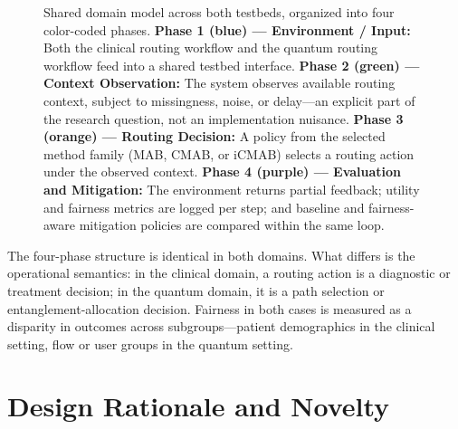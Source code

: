 \documentclass{IEEEtran}
\begin{document}
\begin{figure}[!t]
{%
}
\caption{%
  Shared domain model across both testbeds, organized into four
  color-coded phases.
  \textcolor{phase1blue}{\textbf{Phase 1 (blue) --- Environment / Input:}}
    Both the clinical routing workflow and the quantum routing workflow feed
    into a shared testbed interface.
  \textcolor{phase2green}{\textbf{Phase 2 (green) --- Context Observation:}}
    The system observes available routing context, subject to missingness,
    noise, or delay---an explicit part of the research question, not an
    implementation nuisance.
  \textcolor{phase3orange}{\textbf{Phase 3 (orange) --- Routing Decision:}}
    A policy from the selected method family (MAB, CMAB, or iCMAB) selects
    a routing action under the observed context.
  \textcolor{phase4purple}{\textbf{Phase 4 (purple) --- Evaluation and Mitigation:}}
    The environment returns partial feedback; utility and fairness metrics
    are logged per step; and baseline and fairness-aware mitigation policies
    are compared within the same loop.}
\label{fig:domain_model}
\end{figure}

The four-phase structure is identical in both domains. What differs is the
operational semantics: in the clinical domain, a routing action is a
diagnostic or treatment decision; in the quantum domain, it is a path
selection or entanglement-allocation decision. Fairness in both cases is
measured as a disparity in outcomes across subgroups---patient demographics
in the clinical setting, flow or user groups in the quantum setting.

\section{Design Rationale and Novelty}
\end{document}
